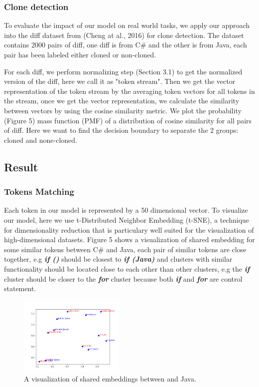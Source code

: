 \subsubsection{Clone detection}
To evaluate the impact of our model on real world tasks, we apply our approach into the diff dataset from (Cheng at al., 2016)\cite{cheng2017clcminer} for clone detection. The dataset contains 2000 pairs of diff, one diff is from C\# and the other is from Java, each pair has been labeled either cloned or non-cloned. 

For each diff, we perform normalizing step (Section 3.1) to get the normalized version of the diff, here we call it as "token stream". Then we get the vector representation of the token stream by the averaging token vectors for all tokens in the stream, once we get the vector representation, we calculate the similarity between vectors by using the cosine similarity metric. We plot the probability (Figure 5) mass function (PMF) of a distribution of cosine similarity for all pairs of diff. Here we want to find the decision boundary to separate the 2 groups: cloned and none-cloned. 

\subsection{Result}
\subsubsection{Tokens Matching}
Each token in our model is represented by a 50 dimensional vector. To visualize our model, here we use t-Distributed Neighbor Embedding (t-SNE)\cite{maaten2008visualizing}, a technique for dimensionality reduction that is particulary well suited for the visualization of high-dimensional datasets. Figure 5 shows a visualization of shared embedding for some similar tokens between C\# and Java, each pair of similar tokens are close together, e.g \textit{\textbf{if ()}} should be closest to \textit{\textbf{if (Java)}} and clusters with similar functionality should be located close to each other than other clusters, e.g the \textit{\textbf{if}} cluster should be closer to the \textit{\textbf{for}} cluster because both \textit{\textbf{if}} and \textit{\textbf{for}} are control statement.

\begin{figure}[t!]
	\includegraphics[width=0.45\textwidth]{example_bi2vec_tsne}
	\caption{A visualization of shared embeddings between  and Java.}
	\label{fig:clf}
\end{figure}

